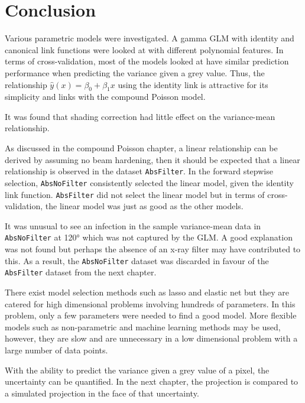 \section{Conclusion}

Various parametric models were investigated. A gamma GLM with identity and canonical link functions were looked at with different polynomial features. In terms of cross-validation, most of the models looked at have similar prediction performance when predicting the variance given a grey value. Thus, the relationship $\widehat{y}(x)=\beta_0+\beta_1 x$ using the identity link is attractive for its simplicity and links with the compound Poisson model.

It was found that shading correction had little effect on the variance-mean relationship.

As discussed in the compound Poisson chapter, a linear relationship can be derived by assuming no beam hardening, then it should be expected that a linear relationship is observed in the dataset \texttt{AbsFilter}. In the forward stepwise selection, \texttt{AbsNoFilter} consistently selected the linear model, given the identity link function. \texttt{AbsFilter} did not select the linear model but in terms of cross-validation, the linear model was just as good as the other models.

It was unusual to see an infection in the sample variance-mean data in \texttt{AbsNoFilter} at \ang{120} which was not captured by the GLM. A good explanation was not found but perhaps the absence of an x-ray filter may have contributed to this. As a result, the \texttt{AbsNoFilter} dataset was discarded in favour of the \texttt{AbsFilter} dataset from the next chapter.

There exist model selection methods such as lasso and elastic net \citep{tibshirani1996regression, zou2005regularization, friedman2010regularization} but they are catered for high dimensional problems involving hundreds of parameters. In this problem, only a few parameters were needed to find a good model. More flexible models such as non-parametric and machine learning methods may be used, however, they are slow and are unnecessary in a low dimensional problem with a large number of data points.

With the ability to predict the variance given a grey value of a pixel, the uncertainty can be quantified. In the next chapter, the projection is compared to a simulated projection in the face of that uncertainty.

